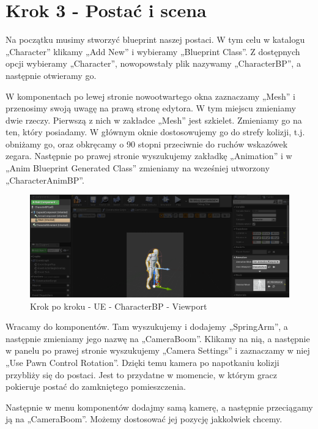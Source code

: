 \documentclass[openright]{xmgr}
\begin{document}
\section{Krok 3 - Postać i scena}

Na początku musimy stworzyć blueprint naszej postaci. W tym celu w katalogu „Character” klikamy „Add New” i wybieramy „Blueprint Class”. Z dostępnych opcji wybieramy „Character”, nowopowstały plik nazywamy „CharacterBP”, a następnie otwieramy go.

W komponentach po lewej stronie nowootwartego okna zaznaczamy „Mesh” i przenosimy swoją uwagę na prawą stronę edytora. W tym miejscu zmieniamy dwie rzeczy. Pierwszą z nich w zakładce „Mesh” jest szkielet. Zmieniamy go na ten, który posiadamy. W głównym oknie dostosowujemy go do strefy kolizji, t.j. obniżamy go, oraz obkręcamy o 90 stopni przeciwnie do ruchów wskazówek zegara. Następnie po prawej stronie wyszukujemy zakładkę „Animation” i w „Anim Blueprint Generated Class” zmieniamy na wcześniej utworzony „CharacterAnimBP”.

\newpage
\begin{figure}[!htb]
    \begin{center}
    \includegraphics[scale=0.35]{Screeny/UeKrokPoKroku/UE-CharacterBP-Viewport.png}
    \end{center}
    \caption{Krok po kroku - UE -  CharacterBP - Viewport}
\end{figure}


Wracamy do komponentów. Tam wyszukujemy i dodajemy „SpringArm”, a następnie zmieniamy jego nazwę na „CameraBoom”. Klikamy na nią, a następnie w panelu po prawej stronie wyszukujemy „Camera Settings” i zaznaczamy w niej „Use Pawn Control Rotation”. Dzięki temu kamera po napotkaniu kolizji przybliży się do postaci. Jest to przydatne w momencie, w którym gracz pokieruje postać do zamkniętego pomieszczenia. 

Następnie w menu komponentów dodajmy samą kamerę, a następnie przeciągamy ją na „CameraBoom”. Możemy dostosować jej pozycję jakkolwiek chcemy.
\end{document}
